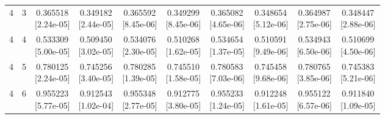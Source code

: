 \documentclass[12pt,letterpaper]{article}
\theoremstyle{plain}
\theoremstyle{definition}
\begin{document}
\begin{table}[p]
\begin{adjustbox}{max width=\linewidth}
\begin{tabular}{@{}rr*{8}{c}@{}}
4 & 3 & \shortstack{0.365518\\[-1pt]{\scriptsize[2.24e-05]}} & \shortstack{0.349182\\[-1pt]{\scriptsize[2.44e-05]}} & \shortstack{0.365592\\[-1pt]{\scriptsize[8.45e-06]}} & \shortstack{0.349299\\[-1pt]{\scriptsize[8.45e-06]}} & \shortstack{0.365082\\[-1pt]{\scriptsize[4.65e-06]}} & \shortstack{0.348654\\[-1pt]{\scriptsize[5.12e-06]}} & \shortstack{0.364987\\[-1pt]{\scriptsize[2.75e-06]}} & \shortstack{0.348447\\[-1pt]{\scriptsize[2.88e-06]}}\\
4 & 4 & \shortstack{0.533309\\[-1pt]{\scriptsize[5.00e-05]}} & \shortstack{0.509450\\[-1pt]{\scriptsize[3.02e-05]}} & \shortstack{0.534076\\[-1pt]{\scriptsize[2.30e-05]}} & \shortstack{0.510268\\[-1pt]{\scriptsize[1.62e-05]}} & \shortstack{0.534654\\[-1pt]{\scriptsize[1.37e-05]}} & \shortstack{0.510591\\[-1pt]{\scriptsize[9.49e-06]}} & \shortstack{0.534943\\[-1pt]{\scriptsize[6.50e-06]}} & \shortstack{0.510699\\[-1pt]{\scriptsize[4.50e-06]}}\\
4 & 5 & \shortstack{0.780125\\[-1pt]{\scriptsize[2.24e-05]}} & \shortstack{0.745256\\[-1pt]{\scriptsize[3.40e-05]}} & \shortstack{0.780285\\[-1pt]{\scriptsize[1.39e-05]}} & \shortstack{0.745510\\[-1pt]{\scriptsize[1.58e-05]}} & \shortstack{0.780583\\[-1pt]{\scriptsize[7.03e-06]}} & \shortstack{0.745458\\[-1pt]{\scriptsize[9.68e-06]}} & \shortstack{0.780765\\[-1pt]{\scriptsize[3.85e-06]}} & \shortstack{0.745383\\[-1pt]{\scriptsize[5.21e-06]}}\\
4 & 6 & \shortstack{0.955223\\[-1pt]{\scriptsize[5.77e-05]}} & \shortstack{0.912543\\[-1pt]{\scriptsize[1.02e-04]}} & \shortstack{0.955348\\[-1pt]{\scriptsize[2.77e-05]}} & \shortstack{0.912775\\[-1pt]{\scriptsize[3.80e-05]}} & \shortstack{0.955233\\[-1pt]{\scriptsize[1.24e-05]}} & \shortstack{0.912248\\[-1pt]{\scriptsize[1.61e-05]}} & \shortstack{0.955122\\[-1pt]{\scriptsize[6.57e-06]}} & \shortstack{0.911840\\[-1pt]{\scriptsize[1.09e-05]}}\\

\end{tabular}
\end{adjustbox}
\end{table}
\end{document}
